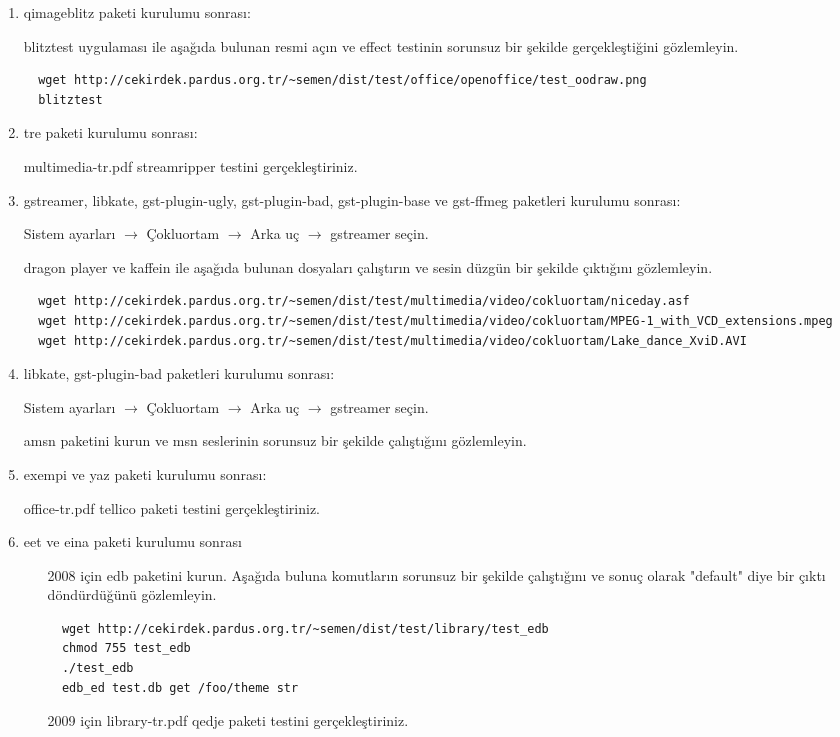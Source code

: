 \documentclass[a4paper,10pt]{article}
\begin{document}
\begin{enumerate}
\item qimageblitz paketi kurulumu sonrası:

blitztest uygulaması ile aşağıda bulunan resmi açın ve effect testinin sorunsuz bir şekilde gerçekleştiğini gözlemleyin.
\begin{verbatim}
  wget http://cekirdek.pardus.org.tr/~semen/dist/test/office/openoffice/test_oodraw.png
  blitztest
\end{verbatim}


\item tre paketi kurulumu sonrası:

multimedia-tr.pdf streamripper testini gerçekleştiriniz.

\item gstreamer, libkate, gst-plugin-ugly, gst-plugin-bad, gst-plugin-base ve gst-ffmeg paketleri kurulumu sonrası:

Sistem ayarları $\rightarrow$ Çokluortam $\rightarrow$ Arka uç $\rightarrow$ gstreamer seçin. 

dragon player ve kaffein ile aşağıda bulunan dosyaları çalıştırın ve sesin düzgün bir şekilde çıktığını gözlemleyin.
\begin{verbatim}
  wget http://cekirdek.pardus.org.tr/~semen/dist/test/multimedia/video/cokluortam/niceday.asf
  wget http://cekirdek.pardus.org.tr/~semen/dist/test/multimedia/video/cokluortam/MPEG-1_with_VCD_extensions.mpeg
  wget http://cekirdek.pardus.org.tr/~semen/dist/test/multimedia/video/cokluortam/Lake_dance_XviD.AVI
\end{verbatim}

\item libkate, gst-plugin-bad paketleri kurulumu sonrası:

Sistem ayarları $\rightarrow$ Çokluortam $\rightarrow$ Arka uç $\rightarrow$ gstreamer seçin. 

amsn paketini kurun ve msn seslerinin sorunsuz bir şekilde çalıştığını gözlemleyin.


\item exempi ve yaz paketi kurulumu sonrası:

office-tr.pdf tellico paketi testini gerçekleştiriniz.

\item eet ve eina paketi kurulumu sonrası
\begin{itemize}
 \item [2008 için] edb paketini kurun. Aşağıda buluna komutların sorunsuz bir şekilde çalıştığını ve sonuç olarak "default" diye bir çıktı döndürdüğünü gözlemleyin.
\begin{verbatim}
  wget http://cekirdek.pardus.org.tr/~semen/dist/test/library/test_edb
  chmod 755 test_edb
  ./test_edb
  edb_ed test.db get /foo/theme str
\end{verbatim}
\item [2009 için] library-tr.pdf qedje paketi testini gerçekleştiriniz.
\end{itemize}


\end{enumerate}
\end{document}

